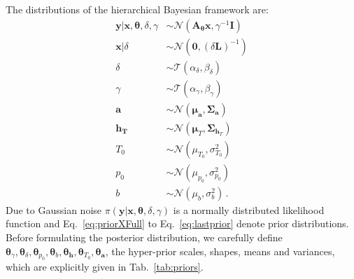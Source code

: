 \clearpage
\noindent
The distributions of the hierarchical Bayesian framework are:
\begin{subequations}
	\label{eq:BayMode}
	\begin{align}
		\bm{y} |  \bm{x},\bm{\theta},\delta,\gamma  &\sim \mathcal{N}(\bm{A}_{\bm{\theta}}  \bm{x}, \gamma^{-1} \bm{I}) \label{eq:likelihoodFull} \\
		\bm{x}| \delta  &\sim \mathcal{N}(\bm{0}, (\delta \bm{L})^{-1} ) \label{eq:priorXFull} \\
		\delta  &\sim \mathcal{T}(\alpha_{\delta} , \beta_{\delta} )\label{eq:priorDelFull} \\
		\gamma  &\sim \mathcal{T}(\alpha_{\gamma}, \beta_{\gamma})\label{eq:priorGamFull} \\
		\bm{a}  &\sim \mathcal{N}(\bm{\mu}_{\bm{a}}, \bm{\Sigma}_{\bm{a}})\\
		\bm{h}_{\bm{T}}  &\sim \mathcal{N}(\bm{\mu}_{T}, \bm{\Sigma}_{\bm{h}_T}) \\
		T_0  &\sim \mathcal{N}(\mu_{T_0}, \sigma^2_{T_0} )\\
		p_0  &\sim \mathcal{N}(\mu_{p_0}, \sigma^2_{p_0} )\\
		b  &\sim \mathcal{N}(\mu_b, \sigma^2_b )  \label{eq:lastprior}  \, .
	\end{align}
\end{subequations}
Due to Gaussian noise $\pi(\bm{y} |  \bm{x},\bm{\theta},\delta,\gamma )$ is a normally distributed likelihood function and Eq.~\ref{eq:priorXFull} to Eq.~\ref{eq:lastprior} denote prior distributions.
Before formulating the posterior distribution, we carefully define $\bm{\theta}_{\gamma}, \bm{\theta}_{\delta},\bm{\theta}_{p_0},\bm{\theta}_{b},\bm{\theta}_{\bm{h}},\bm{\theta}_{T_0},\bm{\theta}_{\bm{a}}$, the hyper-prior scales, shapes, means and variances, which are explicitly given in Tab.~\ref{tab:priors}.

